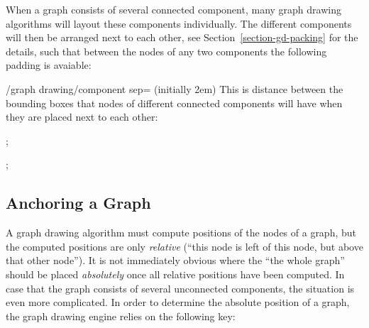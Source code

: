 When a graph consists of several connected component, many graph
drawing algorithms will layout these components individually. The
different components will then be arranged next to each other, see
Section~\ref{section-gd-packing} for the details, such that between
the nodes of any two components the following padding is avaiable:

\begin{key}{/graph drawing/component sep= (initially 2em)}
  This is distance between the bounding boxes that nodes of different
  connected components will have when they are placed next to each
  other:
\begin{codeexample}[]
\tikz {};  
\end{codeexample}
\begin{codeexample}[]
\tikz {};  
\end{codeexample}
\end{key}



\subsection{Anchoring a Graph}

\label{subsection-library-graphdrawing-anchoring}

A graph drawing algorithm must compute positions of the nodes of a
graph, but the computed positions are only \emph{relative} (``this
node is left of this node, but above that other node''). It is not
immediately obvious where the ``the whole graph'' should be placed
\emph{absolutely} once all relative positions have been computed. In
case that the graph consists of several unconnected components, the
situation is even more complicated.
In order to determine the absolute position of a graph, the graph
drawing engine relies on the following key:

